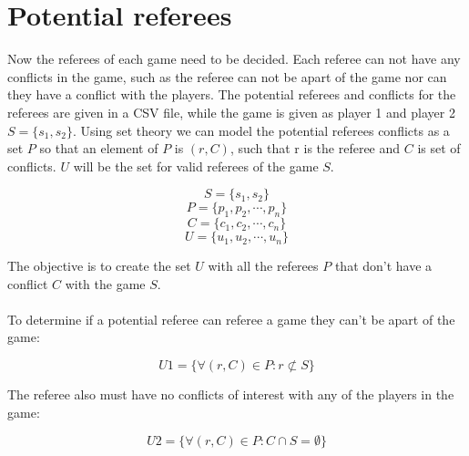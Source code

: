 \documentclass[a4paper]{article}
\begin{document}
\section{Potential referees}
Now the referees of each game need to be decided. Each referee can not have any conflicts in the game, such as the referee can not be apart of the game nor can they have a conflict with the players. The potential referees and conflicts for the referees are given in a CSV file, while the game is given as player 1 and player 2 $S = \{s_1, s_2\}$. Using set theory we can model the potential referees conflicts as a set $P$ so that an element of $P$ is $(r, C)$, such that r is the referee and $C$ is set of conflicts. $U$ will be the set for valid referees of the game $S$. 
\begin{center}
\begin{Large}
\begin{equation}\label{eq:S}
    S = \{s_1, s_2\}
\end{equation}
\begin{equation}\label{eq:P}
    P = \{p_1, p_2, \cdots, p_n\}
\end{equation}
\begin{equation}\label{eq:C}
    C = \{c_1, c_2, \cdots, c_n\}
\end{equation}
\begin{equation}\label{eq:U}
    U = \{u_1, u_2, \cdots, u_n\}
\end{equation}
\end{Large}
\end{center}
The objective is to create the set $U$ with all the referees $P$ that don't have a conflict $C$ with the game $S$.
\\\\
To determine if a potential referee can referee a game they can't be apart of the game:
\begin{center}
\begin{Large}
\begin{equation}\label{eq:U1}
    U1 = \{\forall (r, C) \in P: r \not\subset S\}
\end{equation}
\end{Large}
\end{center}
The referee also must have no conflicts of interest with any of the players in the game:
\begin{center}
\begin{Large}
\begin{equation}\label{eq:U2}
    U2 = \{\forall (r, C) \in P: C \cap S = \emptyset\}
\end{equation}
\end{Large}
\end{center}
\end{document}
